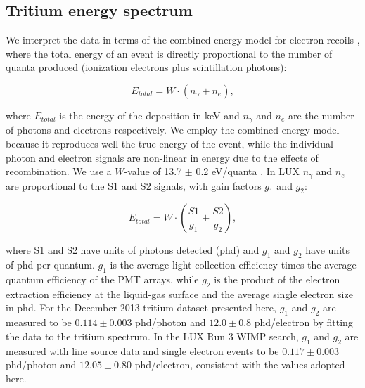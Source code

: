 \subsection{Tritium energy spectrum}

We interpret the data in terms of the combined energy model for electron recoils \cite{Platzman}, where the total energy of an event is directly proportional to the number of quanta produced (ionization electrons plus scintillation photons):

\begin{equation}
E_{total} = W \cdot (n_{\gamma} + n_e ),
\label{platzman_eq}
\end{equation}

\noindent
where $E_{total}$ is the energy of the deposition in keV and  $n_\gamma$ and $n_e$ are the number of photons and electrons respectively. We employ the combined energy model because it reproduces well the true energy of the event, while the individual photon and electron signals are non-linear in energy due to the effects of recombination. We use a $W$-value of 13.7 $\pm$ 0.2 eV/quanta \cite{Dahl_Thesis}. In LUX $n_{\gamma}$ and $n_e$ are proportional to the S1 and S2 signals, with gain factors $g_1$ and $g_2$: 

\begin{equation}
E_{total} = W \cdot \left(\frac{S1}{g_1} + \frac{S2}{g_2} \right),
\label{energy_eq}
\end{equation}

\noindent
where S1 and S2 have units of photons detected (phd) and $g_1$ and $g_2$ have units of phd per quantum. $g_1$ is the average light collection efficiency times the average quantum efficiency of the PMT arrays, while $g_2$ is the product of the electron extraction efficiency at the liquid-gas surface and the average single electron size in phd. For the December 2013 tritium dataset presented here, $g_1$ and $g_2$ are measured to be $0.114 \pm 0.003$ phd/photon and $12.0 \pm 0.8$ phd/electron by fitting the data to the tritium spectrum.  In the LUX Run 3 WIMP search, $g_1$ and $g_2$ are measured with line source data and single electron events to be $0.117 \pm 0.003$ phd/photon and $12.05 \pm 0.80$ phd/electron\cite{lux-reanalysis, lux-prd}, consistent with the values adopted here.

